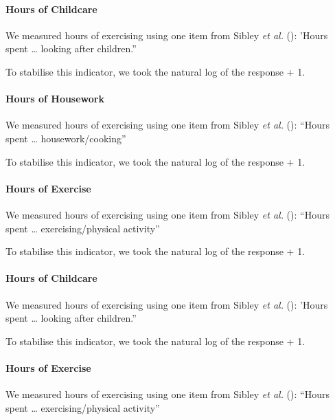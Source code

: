 \documentclass[
  single column]{article}
\let\oldparagraph\paragraph
\renewcommand{\paragraph}[1]{\oldparagraph{#1}\mbox{}}
\begin{document}
\paragraph{Hours of Childcare}\label{hours-of-childcare}

We measured hours of exercising using one item from Sibley \emph{et al.}
(): 'Hours spent \ldots{} looking after
children.''

To stabilise this indicator, we took the natural log of the response +
1.

\paragraph{Hours of Housework}\label{hours-of-housework}

We measured hours of exercising using one item from Sibley \emph{et al.}
(): ``Hours spent \ldots{}
housework/cooking''

To stabilise this indicator, we took the natural log of the response +
1.

\paragraph{Hours of Exercise}\label{hours-of-exercise}

We measured hours of exercising using one item from Sibley \emph{et al.}
(): ``Hours spent \ldots{}
exercising/physical activity''

To stabilise this indicator, we took the natural log of the response +
1.

\paragraph{Hours of Childcare}\label{hours-of-childcare-1}

We measured hours of exercising using one item from Sibley \emph{et al.}
(): 'Hours spent \ldots{} looking after
children.''

To stabilise this indicator, we took the natural log of the response +
1.

\paragraph{Hours of Exercise}\label{hours-of-exercise-1}

We measured hours of exercising using one item from Sibley \emph{et al.}
(): ``Hours spent \ldots{}
exercising/physical activity''
\end{document}
